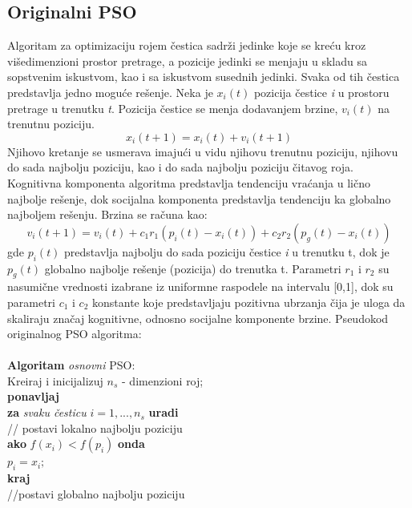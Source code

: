 \documentclass[a4paper]{article}
\begin{document}
\subsection{Originalni PSO}
Algoritam za optimizaciju rojem čestica sadrži jedinke koje se kreću kroz višedimenzioni prostor pretrage, a pozicije jedinki se menjaju u skladu sa sopstvenim iskustvom, kao i sa iskustvom susednih jedinki. Svaka od tih čestica predstavlja jedno moguće rešenje.
Neka je $x_i(t)$ pozicija čestice \textit{i} u prostoru pretrage u trenutku \textit{t}. Pozicija čestice se menja dodavanjem brzine, $v_i(t)$ na trenutnu poziciju. \[x_i(t+1) = x_i(t) + v_i(t+1) \]
Njihovo kretanje se usmerava imajući u vidu njihovu trenutnu poziciju, njihovu do sada najbolju poziciju, kao i do sada najbolju poziciju čitavog roja. Kognitivna komponenta algoritma predstavlja tendenciju vraćanja u lično najbolje rešenje, dok socijalna komponenta predstavlja tendenciju ka globalno najboljem rešenju. Brzina se računa kao: \[ v_i(t+1) = v_i(t) + c_1r_1(p_i(t) - x_i(t)) + c_2r_2(p_g(t) - x_i(t))\]
gde $p_i(t)$ predstavlja najbolju do sada poziciju čestice \textit{i} u trenutku t, dok je $p_g(t)$ globalno najbolje rešenje (pozicija) do trenutka t. Parametri $r_1$ i $r_2$ su nasumične vrednosti izabrane iz uniformne raspodele na intervalu [0,1], dok su parametri $c_1$ i $c_2$ konstante koje predstavljaju pozitivna ubrzanja čija je uloga da skaliraju značaj kognitivne, odnosno socijalne komponente brzine. 
Pseudokod originalnog PSO algoritma: \\ \\
\textbf{Algoritam} \textit{osnovni} PSO: \\ 
Kreiraj i inicijalizuj $n_s$ - dimenzioni roj;\\
\textbf{ponavljaj} \\ 
\hspace*{5mm}\textbf{za} \textit{svaku česticu} $\textit{i} = 1,...,n_s$ \textbf{uradi} \\
\hspace*{5mm} // postavi lokalno najbolju poziciju \\
\hspace*{10mm} \textbf{ako} $f(x_i) < f(p_i)$ \textbf{onda} \\
\hspace*{15mm} $p_i = x_i;$ \\
\hspace*{10mm} \textbf{kraj} \\
\hspace*{5mm}//postavi globalno najbolju poziciju \\\
\end{document}
